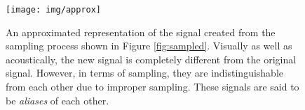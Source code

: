 \begin{figure}[p!]

  \centering

  \texttt{[image: img/approx]}

  \caption{An approximated representation of the signal created from the sampling process shown in Figure \ref{fig:sampled}. Visually as well as acoustically, the new signal is completely different from the original signal. However, in terms of sampling, they are indistinguishable from each other due to improper sampling. These signals are said to be \emph{aliases} of each other.}

  \label{fig:approx}

\end{figure}
